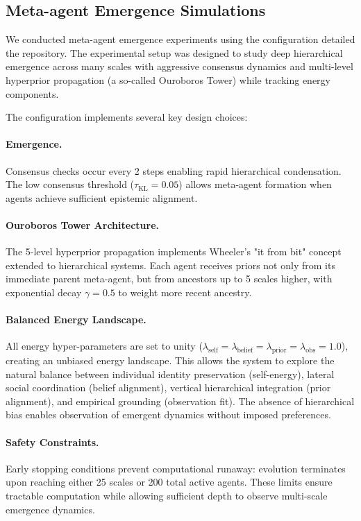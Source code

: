 \documentclass[11pt]{article}
\begin{document}
\subsection{Meta-agent Emergence Simulations}

We conducted meta-agent emergence experiments using the configuration detailed the repository. The experimental setup was designed to study deep hierarchical emergence across many scales with aggressive consensus dynamics and multi-level hyperprior propagation (a so-called Ouroboros Tower) while tracking energy components.

The configuration implements several key design choices:

\paragraph{Emergence.}
Consensus checks occur every 2 steps enabling rapid hierarchical condensation. The low consensus threshold ($\tau_{\text{KL}} = 0.05$) allows meta-agent formation when agents achieve sufficient epistemic alignment.

\paragraph{Ouroboros Tower Architecture.}
The 5-level hyperprior propagation implements Wheeler's "it from bit" concept extended to hierarchical systems. Each agent receives priors not only from its immediate parent meta-agent, but from ancestors up to 5 scales higher, with exponential decay $\gamma = 0.5$ to weight more recent ancestry.

\paragraph{Balanced Energy Landscape.}
All energy hyper-parameters are set to unity ($\lambda_{\text{self}} = \lambda_{\text{belief}} = \lambda_{\text{prior}} = \lambda_{\text{obs}} = 1.0$), creating an unbiased energy landscape. This allows the system to explore the natural balance between individual identity preservation (self-energy), lateral social coordination (belief alignment), vertical hierarchical integration (prior alignment), and empirical grounding (observation fit). The absence of hierarchical bias enables observation of emergent dynamics without imposed preferences.

\paragraph{Safety Constraints.}
Early stopping conditions prevent computational runaway: evolution terminates upon reaching either 25 scales or 200 total active agents. These limits ensure tractable computation while allowing sufficient depth to observe multi-scale emergence dynamics.
\end{document}

